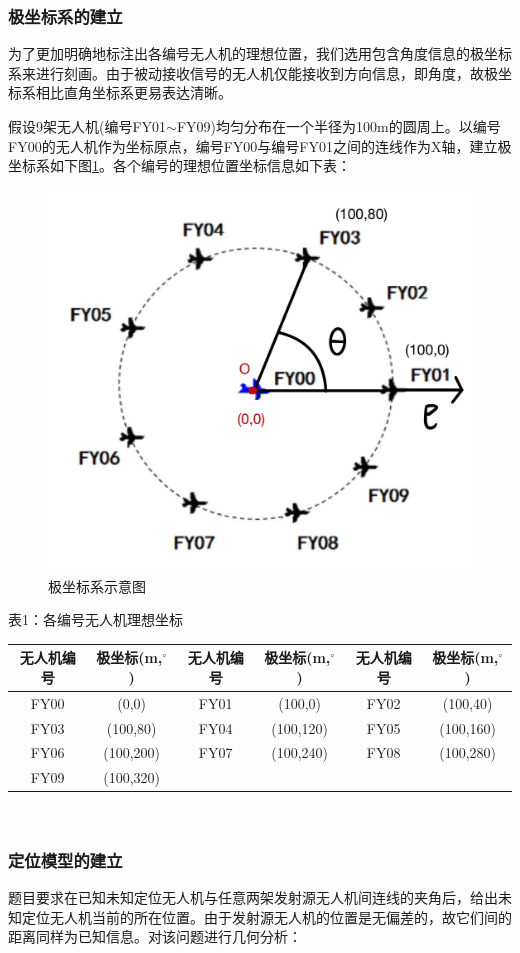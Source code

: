 \documentclass{ctexart}
\begin{document}
\subsubsection{极坐标系的建立}

为了更加明确地标注出各编号无人机的理想位置，我们选用包含角度信息的极坐标系来进行刻画。由于被动接收信号的无人机仅能接收到方向信息，即角度，故极坐标系相比直角坐标系更易表达清晰。

假设9架无人机(编号FY01$\sim$FY09)均匀分布在一个半径为100m的圆周上。以编号FY00的无人机作为坐标原点，编号FY00与编号FY01之间的连线作为X轴，建立极坐标系如下图\ref{极坐标系示意图}。各个编号的理想位置坐标信息如下表：

\begin{figure}[H]
  \centering
  \includegraphics[width=0.40\linewidth]{pic/极坐标.jpg}
  \caption{极坐标系示意图}
  \label{极坐标系示意图}
  \end{figure} 

\begin{center}
  表1：各编号无人机理想坐标
  ~\\
    \begin{tabular}{|c|c|c|c|c|c|}
        \hline
        无人机编号&极坐标(m,$^{\circ}$)&无人机编号&极坐标(m,$^{\circ}$)&无人机编号&极坐标(m,$^{\circ}$)\\
        \hline
        FY00&(0,0)&FY01&(100,0)&FY02&(100,40)\\
        \hline
        FY03&(100,80)&FY04&(100,120)&FY05&(100,160)\\
        \hline
        FY06&(100,200)&FY07&(100,240)&FY08&(100,280)\\
        \hline
        FY09&(100,320)& & & &\\    

        \hline
    \end{tabular}\\
\end{center}
\subsubsection{定位模型的建立}
题目要求在已知未知定位无人机与任意两架发射源无人机间连线的夹角后，给出未知定位无人机当前的所在位置。由于发射源无人机的位置是无偏差的，故它们间的距离同样为已知信息。对该问题进行几何分析：
\end{document}
